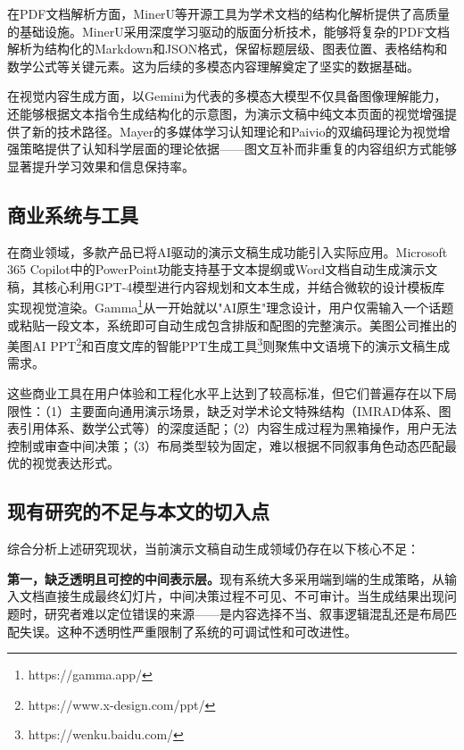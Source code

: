 在PDF文档解析方面，MinerU\cite{wang2024minerupdf}等开源工具为学术文档的结构化解析提供了高质量的基础设施。MinerU采用深度学习驱动的版面分析技术，能够将复杂的PDF文档解析为结构化的Markdown和JSON格式，保留标题层级、图表位置、表格结构和数学公式等关键元素。这为后续的多模态内容理解奠定了坚实的数据基础。

在视觉内容生成方面，以Gemini\cite{team2024gemini}为代表的多模态大模型不仅具备图像理解能力，还能够根据文本指令生成结构化的示意图，为演示文稿中纯文本页面的视觉增强提供了新的技术路径。Mayer的多媒体学习认知理论\cite{mayer2009multimedia}和Paivio的双编码理论\cite{paivio1986mental}为视觉增强策略提供了认知科学层面的理论依据——图文互补而非重复的内容组织方式能够显著提升学习效果和信息保持率。

\subsection{商业系统与工具}

在商业领域，多款产品已将AI驱动的演示文稿生成功能引入实际应用。Microsoft 365 Copilot中的PowerPoint功能支持基于文本提纲或Word文档自动生成演示文稿\cite{microsoft2023copilot}，其核心利用GPT-4模型进行内容规划和文本生成，并结合微软的设计模板库实现视觉渲染。Gamma\footnote{https://gamma.app/}从一开始就以"AI原生"理念设计，用户仅需输入一个话题或粘贴一段文本，系统即可自动生成包含排版和配图的完整演示。美图公司推出的美图AI PPT\footnote{https://www.x-design.com/ppt/}和百度文库的智能PPT生成工具\footnote{https://wenku.baidu.com/}则聚焦中文语境下的演示文稿生成需求。

这些商业工具在用户体验和工程化水平上达到了较高标准，但它们普遍存在以下局限性：（1）主要面向通用演示场景，缺乏对学术论文特殊结构（IMRAD体系、图表引用体系、数学公式等）的深度适配；（2）内容生成过程为黑箱操作，用户无法控制或审查中间决策；（3）布局类型较为固定，难以根据不同叙事角色动态匹配最优的视觉表达形式。

\subsection{现有研究的不足与本文的切入点}

综合分析上述研究现状，当前演示文稿自动生成领域仍存在以下核心不足：

\textbf{第一，缺乏透明且可控的中间表示层。}现有系统大多采用端到端的生成策略，从输入文档直接生成最终幻灯片，中间决策过程不可见、不可审计。当生成结果出现问题时，研究者难以定位错误的来源——是内容选择不当、叙事逻辑混乱还是布局匹配失误。这种不透明性严重限制了系统的可调试性和可改进性。

